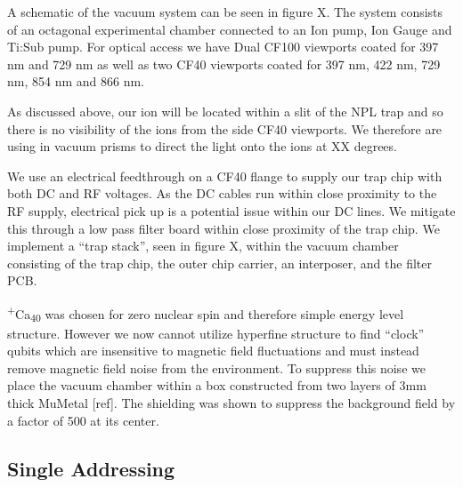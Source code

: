 \documentclass[12pt]{iopart}
\begin{document}
A schematic of the vacuum system can be seen in figure X. The system
consists of an octagonal experimental chamber connected to an Ion
pump, Ion Gauge and Ti:Sub pump. For optical access we have Dual CF100
viewports coated for 397 nm and 729 nm as well as two CF40 viewports
coated for 397 nm, 422 nm, 729 nm, 854 nm and 866 nm.

As discussed above, our ion will be located within a slit of the NPL
trap and so there is no visibility of the ions from the side CF40
viewports. We therefore are using in vacuum prisms to direct the light
onto the ions at XX degrees.

We use an electrical feedthrough on a CF40 flange to supply our trap
chip with both DC and RF voltages. As the DC cables run within close
proximity to the RF supply, electrical pick up is a potential issue
within our DC lines. We mitigate this through a low pass filter board
within close proximity of the trap chip. We implement a ``trap
stack'', seen in figure X, within the vacuum chamber consisting of the
trap chip, the outer chip carrier, an interposer, and the filter PCB.

\textsuperscript{+}Ca\textsubscript{40} was chosen for zero nuclear
spin and therefore simple energy level structure. However we now
cannot utilize hyperfine structure to find ``clock'' qubits which are
insensitive to magnetic field fluctuations and must instead remove
magnetic field noise from the environment. To suppress this noise 
we place the vacuum chamber within a box constructed from two layers
of 3mm thick MuMetal [ref]. The shielding was shown to suppress the
background field by a factor of 500 at its center.

\subsection{Single Addressing}
\end{document}
